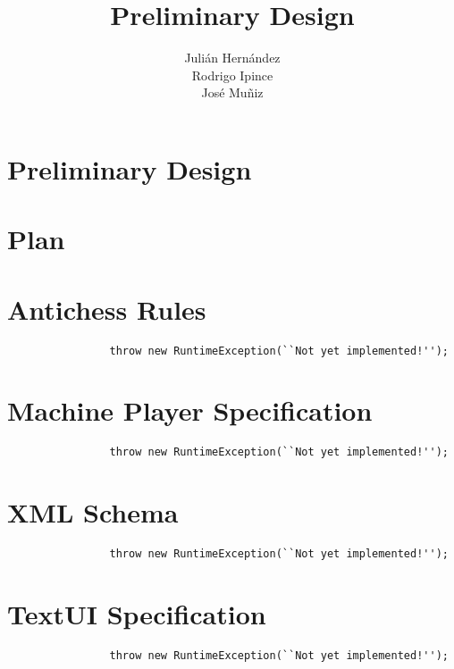 \documentclass{report}
\author{Juli\'{a}n Hern\'{a}ndez\\
        Rodrigo Ipince\\
        Jos\'{e} Mu\~{n}iz}
\title{Preliminary Design}
\begin{document}
	\maketitle
	\tableofcontents
	
	\chapter{Preliminary Design}
	
		
		
	\chapter{Plan}
		
			
	\appendix
		 \chapter{Antichess Rules}\label{6170acrules}
		 	\begin{verbatim}
		 		throw new RuntimeException(``Not yet implemented!'');
		 	\end{verbatim}
		 \chapter{Machine Player Specification}\label{machineplayerspec}
		 	\begin{verbatim}
		 		throw new RuntimeException(``Not yet implemented!'');
		 	\end{verbatim}
		 \chapter{XML Schema}\label{xmlformat}
		 	\begin{verbatim}
		 		throw new RuntimeException(``Not yet implemented!'');
		 	\end{verbatim}
		 \chapter{TextUI Specification}\label{textuispec}
		 	\begin{verbatim}
		 		throw new RuntimeException(``Not yet implemented!'');
		 	\end{verbatim}
	
	
	\printindex
		 
\end{document}
